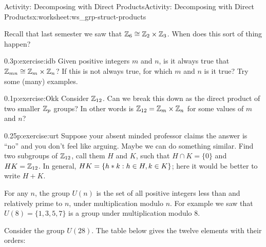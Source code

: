 \documentclass[11pt]{book}
\begin{document}
%
%
\typeout{************************************************}
\typeout{************************************************}
%
\begin{worksheet-subsection}{Activity: Decomposing with Direct Products}{}{Activity: Decomposing with Direct Products}{}{}{x:worksheet:ws_grp-struct-products}
\begin{introduction}{}%
Recall that last semester we saw that \(\mathbb{Z}_6 \cong \mathbb{Z}_2\times \mathbb{Z}_3\).  When does this sort of thing happen?%
\end{introduction}%
\begin{divisionexercise}{1}{}{0.3}{p:exercise:idb}%
Given positive integers \(m\) and \(n\), is it always true that \(\mathbb{Z}_{mn} \cong \mathbb{Z}_m\times \mathbb{Z}_n\)?   If this is not always true, for which \(m\) and \(n\) is it true?  Try some (many) examples.%
\end{divisionexercise}%
\begin{divisionexercise}{2}{}{0.1}{p:exercise:Okk}%
Consider \(\mathbb{Z}_{12}\).  Can we break this down as the direct product of two smaller \(\mathbb{Z}_p\) groups?  In other words is \(\mathbb{Z}_{12} = \mathbb{Z}_m \times \mathbb{Z}_n\) for some values of \(m\) and \(n\)?%
\end{divisionexercise}%
\begin{divisionexercise}{3}{}{0.25}{p:exercise:urt}%
Suppose your absent minded professor claims the answer is ``no'' and you don't feel like arguing.   Maybe we can do something similar.  Find two subgroups of \(\mathbb{Z}_{12}\), call them \(H\) and \(K\), such that \(H \cap K = \{0\}\) and \(HK = \mathbb{Z}_{12}\).  In general, \(HK = \{h\ast k : h \in H, k \in K\}\); here it would be better to write \(H+K\).%
\end{divisionexercise}%
\clearpage
For any \(n\), the group \(U(n)\) is the set of all positive integers less than and relatively prime to \(n\), under multiplication modulo \(n\).  For example we saw that \(U(8) = \{1,3, 5, 7\}\)  is a group under multiplication modulo 8.%
\par
Consider the group \(U(28)\).  The table below gives the twelve elements with their orders: \begin{sidebyside}{1}{0}{0}{0}%
\begin{sbspanel}{1}%
\end{sbspanel}
\end{sidebyside}
\end{worksheet-subsection}
\end{document}
